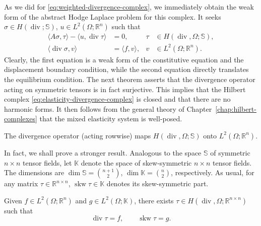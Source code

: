 {As we did for \eqref{eq:weighted-divergence-complex}, we immediately obtain the weak form of the abstract Hodge Laplace problem for this complex. It seeks $\sigma\in H(\operatorname{div};\mathbb S)$, $u\in L^2(\Omega;\mathbb R^n)$ such that}
\[
\begin{aligned}\langle A\sigma,\tau\rangle-\langle u,\operatorname{div}\tau\rangle&=0,&\tau&\in H(\operatorname{div},\Omega;\mathbb S),\\\langle\operatorname{div}\sigma,v\rangle&=\langle f,v\rangle,&v&\in L^2(\Omega;\mathbb R^n).\end{aligned}
\]
{Clearly, the first equation is a weak form of the constitutive equation and the displacement boundary condition, while the second equation directly translates the equilibrium condition. The next theorem asserts that the divergence operator acting on symmetric tensors is in fact surjective. This implies that the Hilbert complex \eqref{eq:elasticity-divergence-complex} is closed and that there are no harmonic forms. It then follows from the general theory of Chapter~\ref{chap:hilbert-complexes} that the mixed elasticity system is well-posed.}

\begin{Theorem}\label{thm:symmetric-tensor-divergence-surjectivity}
{The divergence operator (acting rowwise) maps $H(\operatorname{div},\Omega;\mathbb S)$ onto $L^2(\Omega;\mathbb R^n)$.}
\end{Theorem}

{In fact, we shall prove a stronger result. Analogous to the space $\mathbb S$ of symmetric $n\times n$ tensor fields, let $\mathbb K$ denote the space of skew-symmetric $n\times n$ tensor fields. The dimensions are $\dim\mathbb S=\binom{n+1}2$, $\dim\mathbb K=\binom n2$, respectively. As usual, for any matrix $\tau\in\mathbb R^{n\times n}$, $\operatorname{skw}\tau\in\mathbb K$ denotes its skew-symmetric part.}

\begin{Theorem}\label{thm:divergence-skew-surjectivity}
{Given $f\in L^2(\Omega;\mathbb R^n)$ and $g\in L^2(\Omega;\mathbb K)$, there exists $\tau\in H(\operatorname{div},\Omega;\mathbb R^{n\times n})$ such that}
\[
\operatorname{div}\tau=f,\qquad\operatorname{skw}\tau=g.
\]
\end{Theorem}

